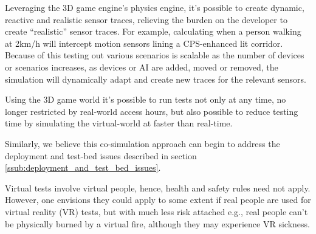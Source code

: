 Leveraging the 3D game engine's physics engine, it's possible to create dynamic, reactive and realistic sensor traces, relieving the burden on the developer to create ``realistic'' sensor traces. For example, calculating when a person walking at 2km/h will intercept motion sensors lining a CPS-enhanced lit corridor. Because of this testing out various scenarios is scalable as the number of devices or scenarios increases, as devices or AI are added, moved or removed, the simulation will dynamically adapt and create new traces for the relevant sensors.

Using the 3D game world it's possible to run tests not only at any time, no longer restricted by real-world access hours, but also possible to reduce testing time by simulating the virtual-world at faster than real-time.


Similarly, we believe this co-simulation approach can begin to address the deployment and test-bed issues described in section \ref{ssub:deployment_and_test_bed_issues}.

Virtual tests involve virtual people, hence, health and safety rules need not apply. However, one envisions they could apply to some extent if real people are used for virtual reality (VR) tests, but with much less risk attached e.g., real people can't be physically burned by a virtual fire, although they may experience VR sickness.


